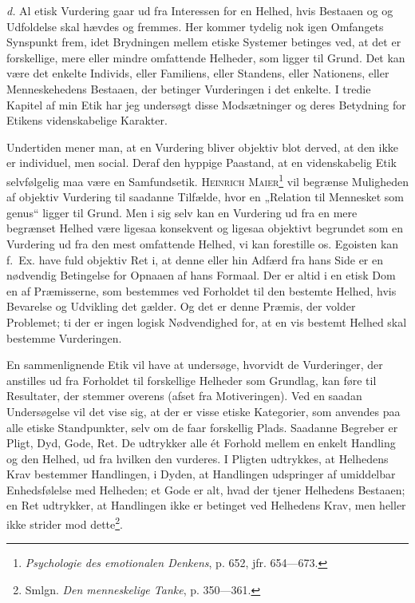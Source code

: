 \documentclass[12pt]{article}
\newcommand{\opage}[1]{\marginnote{\footnotesize\textit{[#1]}}}
\begin{document}
\textit{d.} Al etisk Vurdering gaar ud fra Interessen for en Helhed, hvis
Bestaaen og
og Udfoldelse skal hævdes og fremmes. Her kommer tydelig nok igen Omfangets
Synspunkt frem, idet Brydningen mellem etiske Systemer betinges ved, at det er
forskellige, mere eller mindre omfattende Helheder, som ligger til Grund. Det
kan være det enkelte Individs, eller Familiens, eller Standens, eller Nationens,
eller Menneskehedens Bestaaen, der betinger Vurderingen i det enkelte. I tredie
Kapitel af min Etik har jeg undersøgt disse Modsætninger og deres Betydning for
Etikens videnskabelige Karakter.

Undertiden mener man, at en Vurdering bliver objektiv blot derved, at den ikke
er individuel, men social. Deraf den hyppige Paastand, at en videnskabelig
\setcounter{footnote}{0}%
\opage{70}Etik selvfølgelig maa være en Samfundsetik. \textsc{Heinrich
Maier}\footnote{\textit{Psychologie des emotionalen Denkens}, p. 652, jfr.
654---673.} vil begrænse Muligheden af objektiv Vurdering til saadanne Tilfælde,
hvor en „Relation til Mennesket som genus“ ligger til Grund. Men i sig selv kan
en Vurdering ud fra en mere begrænset Helhed være ligesaa konsekvent og ligesaa
objektivt begrundet som en Vurdering ud fra den mest omfattende Helhed, vi kan
forestille os. Egoisten kan f.~Ex. have fuld objektiv Ret i, at denne eller hin
Adfærd fra hans Side er en nødvendig Betingelse for Opnaaen af hans Formaal. Der
er altid i en etisk Dom en af Præmisserne, som bestemmes ved Forholdet til den
bestemte Helhed, hvis Bevarelse og Udvikling det gælder. Og det er denne Præmis,
der volder Problemet; ti der er ingen logisk Nødvendighed for, at en vis bestemt
Helhed skal bestemme Vurderingen.

En sammenlignende Etik vil have at undersøge, hvorvidt de Vurderinger, der
anstilles ud fra Forholdet til forskellige Helheder som Grundlag, kan føre til
Resultater, der stemmer overens (afset fra Motiveringen). Ved en saadan
Undersøgelse vil det vise sig, at der er visse etiske Kategorier, som anvendes
paa alle etiske Standpunkter, selv om de faar forskellig Plads. Saadanne
Begreber er Pligt, Dyd, Gode, Ret. De udtrykker alle ét Forhold mellem en enkelt
Handling og den Helhed, ud fra hvilken den vurderes. I Pligten udtrykkes, at
Helhedens Krav bestemmer Handlingen, i Dyden, at Handlingen udspringer af
umiddelbar Enhedsfølelse med Helheden; et Gode er alt, hvad der tjener Helhedens
Bestaaen; en Ret udtrykker, at Handlingen ikke er betinget ved Helhedens Krav,
men heller ikke strider mod dette\footnote{Smlgn. \textit{Den menneskelige
Tanke}, p. 350---361.}.
\end{document}
